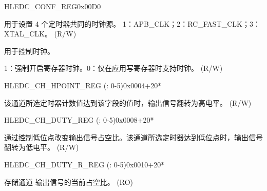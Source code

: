 \begin{register}{H}{LEDC\_CONF\_REG}{0x00D0}\label{regdesc:LEDCCONFREG}
%
%
%
\regnewline%
\begin{regdesc}\begin{reglist}
\label{fielddesc:LEDCAPBCLKSEL}\item [LEDC\_APB\_CLK\_SEL] 用于设置 4 个定时器共同的时钟源。
1：APB\_CLK；2：RC\_FAST\_CLK；3：XTAL\_CLK。 (R/W)
\label{fielddesc:LEDCCLKEN}\item [LEDC\_CLK\_EN] 用于控制时钟。

1：强制开启寄存器时钟。0：仅在应用写寄存器时支持时钟。 (R/W)
\end{reglist}\end{regdesc}
\end{register}


\begin{register}{H}{LEDC\_CH\_HPOINT\_REG (: 0-5)}{0x0004+20*}\label{regdesc:LEDCCHNHPOINTREG}
%
%
\regnewline%
\begin{regdesc}\begin{reglist}
\label{fielddesc:LEDCHPOINTCHN}\item [LEDC\_HPOINT\_CH\regindex{n}] 该通道所选定时器计数值达到该字段的值时，输出信号翻转为高电平。 (R/W)
\end{reglist}\end{regdesc}
\end{register}


\begin{register}{H}{LEDC\_CH\_DUTY\_REG (: 0-5)}{0x0008+20*}\label{regdesc:LEDCCHNDUTYREG}
%
%
\regnewline%
\begin{regdesc}\begin{reglist}
\label{fielddesc:LEDCDUTYCHN}\item [LEDC\_DUTY\_CH\regindex{n}] 通过控制低位点改变输出信号占空比。该通道所选定时器达到低位点时，输出信号翻转为低电平。 (R/W)
\end{reglist}\end{regdesc}
\end{register}


\begin{register}{H}{LEDC\_CH\_DUTY\_R\_REG (: 0-5)}{0x0010+20*}\label{regdesc:LEDCCHNDUTYRREG}
%
%
\regnewline%
\begin{regdesc}\begin{reglist}
\label{fielddesc:LEDCDUTYRCHN}\item [LEDC\_DUTY\_R\_CH\regindex{n}] 存储通道  输出信号的当前占空比。 (RO)
\end{reglist}\end{regdesc}
\end{register}


